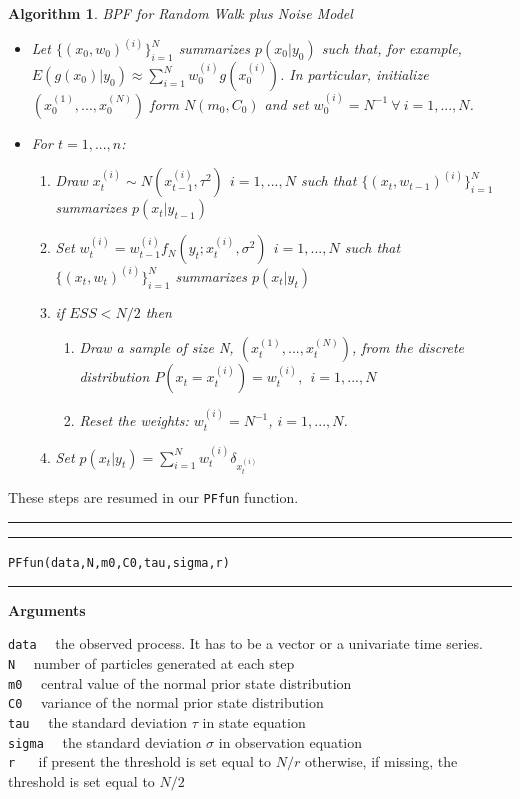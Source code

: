 \documentclass[
]{book}
\theoremstyle{break}
\theoremstyle{nonumberplain}
\newtheorem{algorithm}{Algorithm}[section]
\begin{document}
\begin{algorithm} BPF for Random Walk plus Noise Model
\begin{itemize}
\item Let $\{(x_{0},w_{0})^{(i)}\}_{i=1}^{N}$ summarizes $p(x_{0}|y_{0})$ such that, for example, $E(g(x_{0})|y_{0}) \approx \sum_{i=1}^{N}w_{0}^{(i)}g(x_{0}^{(i)})$. In particular, initialize $(x_{0}^{(1)},...,x_{0}^{(N)})$ form $N(m_{0},C_{0})$ and set $w_{0}^{(i)}=N^{-1} \ \forall \ i=1,...,N$.
\item For $t=1,...,n$:
\begin{enumerate}
\item Draw $x_{t}^{(i)} \sim N(x_{t-1}^{(i)},\tau^2) \ \ i=1,...,N$ such that $\{(x_{t},w_{t-1})^{(i)}\}_{i=1}^{N}$ summarizes $p(x_{t}|y_{t-1})$
\item Set $w_{t}^{(i)} = w_{t-1}^{(i)}f_{N}(y_{t};x_{t}^{(i)},\sigma^2) \ \ i=1,...,N$ such that $\{(x_{t},w_{t})^{(i)}\}_{i=1}^{N}$ summarizes $p(x_{t}|y_{t})$
\item if $ESS<N/2$ then
\begin{enumerate}
\item Draw a sample of size N, $(x_{t}^{(1)},...,x_{t}^{(N)})$, from the discrete distribution $P(x_{t}=x_{t}^{(i)})=w_{t}^{(i)},\ \ i=1,...,N$
\item Reset the weights: $w_{t}^{(i)}=N^{-1}$, $i=1,...,N$.
\end{enumerate}
\item Set $p(x_{t}|y_{t})=\sum_{i=1}^{N}w_{t}^{(i)}\delta_{x_{t}^{(i)}}$
\end{enumerate}
\end{itemize}
\end{algorithm}

These steps are resumed in our \texttt{PFfun} function.\\

\hrule
\hrule

\hfill\break
\texttt{PFfun(data,N,m0,C0,tau,sigma,r)}\\

\hrule

\textbf{Arguments}

\texttt{data} ~~the observed process. It has to be a vector or a
univariate time series.\\
\texttt{N} ~~number of particles generated at each step\\
\texttt{m0} ~~central value of the normal prior state distribution\\
\texttt{C0} ~~variance of the normal prior state distribution\\
\texttt{tau} ~~the standard deviation \(\tau\) in state equation\\
\texttt{sigma} ~~the standard deviation \(\sigma\) in observation
equation\\
\texttt{r} ~~ if present the threshold is set equal to \(N/r\)
otherwise, if missing, the threshold is set equal to \(N/2\)
\end{document}
